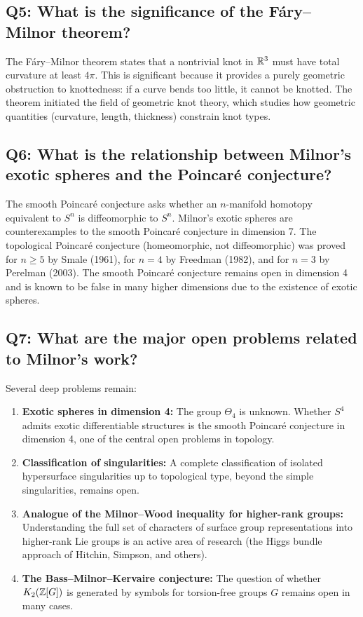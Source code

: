 \subsection*{Q5: What is the significance of the F\'ary--Milnor theorem?}

The F\'ary--Milnor theorem states that a nontrivial knot in \(\mathbb{R}^3\) must have total curvature at least \(4\pi\). This is significant because it provides a purely geometric obstruction to knottedness: if a curve bends too little, it cannot be knotted. The theorem initiated the field of geometric knot theory, which studies how geometric quantities (curvature, length, thickness) constrain knot types.

\subsection*{Q6: What is the relationship between Milnor's exotic spheres and the Poincar\'e conjecture?}

The smooth Poincar\'e conjecture asks whether an \(n\)-manifold homotopy equivalent to \(S^n\) is diffeomorphic to \(S^n\). Milnor's exotic spheres are counterexamples to the smooth Poincar\'e conjecture in dimension 7. The topological Poincar\'e conjecture (homeomorphic, not diffeomorphic) was proved for \(n \geq 5\) by Smale (1961), for \(n = 4\) by Freedman (1982), and for \(n = 3\) by Perelman (2003). The smooth Poincar\'e conjecture remains open in dimension 4 and is known to be false in many higher dimensions due to the existence of exotic spheres.

\subsection*{Q7: What are the major open problems related to Milnor's work?}

Several deep problems remain:
\begin{enumerate}
    \item \textbf{Exotic spheres in dimension 4:} The group \(\Theta_4\) is unknown. Whether \(S^4\) admits exotic differentiable structures is the smooth Poincar\'e conjecture in dimension 4, one of the central open problems in topology.
    \item \textbf{Classification of singularities:} A complete classification of isolated hypersurface singularities up to topological type, beyond the simple singularities, remains open.
    \item \textbf{Analogue of the Milnor--Wood inequality for higher-rank groups:} Understanding the full set of characters of surface group representations into higher-rank Lie groups is an active area of research (the Higgs bundle approach of Hitchin, Simpson, and others).
    \item \textbf{The Bass--Milnor--Kervaire conjecture:} The question of whether \(K_2(\mathbb{Z}[G])\) is generated by symbols for torsion-free groups \(G\) remains open in many cases.
\end{enumerate}

